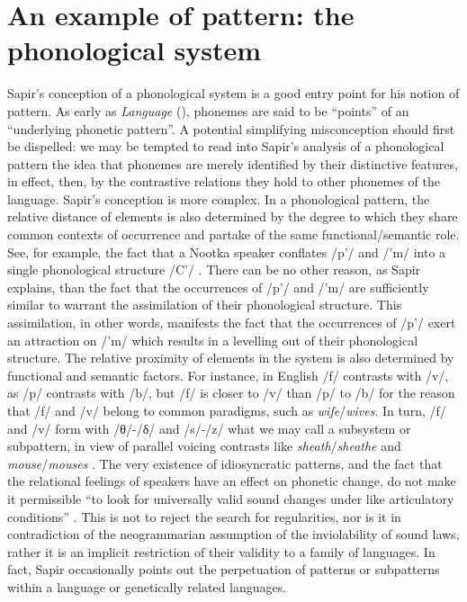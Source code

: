 \documentclass[output=paper]{langscibook}
\begin{document}
\section{An example of pattern: the phonological system}
\label{sec:fortis:egpattern}

Sapir's conception of a phonological system is a good entry point for his notion of pattern. As early as \emph{Language} (\citeyear{Sapir1921}), phonemes are said to be ``points'' of an ``underlying phonetic pattern''. A potential simplifying misconception should first be dispelled: we may be tempted to read into Sapir's analysis of a phonological pattern the idea that phonemes are merely identified by their distinctive features, in effect, then, by the contrastive relations they hold to other phonemes of the language. Sapir's conception is more complex. In a phonological pattern, the relative distance of elements is also determined by the degree to which they share common contexts of occurrence and partake of the same functional/semantic role. See, for example, the fact that a Nootka speaker conflates /p'/ and /'m/ into a single phonological structure /C'/ \citep[55--57]{Sapir1933}. There can be no other reason, as Sapir explains, than the fact that the occurrences of /p'/ and /'m/ are sufficiently similar to warrant the assimilation of their phonological structure. This assimilation, in other words, manifests the fact that the occurrences of /p'/ exert an attraction on /'m/ which results in a levelling out of their phonological structure. The relative proximity of elements in the system is also determined by functional and semantic factors. For instance, in English /f/ contrasts with /v/, as /p/ contrasts with /b/, but /f/ is closer to /v/ than /p/ to /b/ for the reason that /f/ and /v/ belong to common paradigms, such as \emph{wife}/\emph{wives}. In turn, /f/ and /v/ form with /θ/-/δ/ and /s/-/z/ what we may call a subsystem or subpattern, in view of parallel voicing contrasts like \emph{sheath}/\emph{sheathe} and \emph{mouse}/\emph{mouses} \citep[48]{Sapir1933}. The very existence of idiosyncratic patterns, and the fact that the relational feelings of speakers have an effect on phonetic change, do not make it permissible ``to look for universally valid sound changes under like articulatory conditions'' \citep[48]{Sapir1933}. This is not to reject the search for regularities, nor is it in contradiction of the neogrammarian assumption of the inviolability of sound laws, rather it is an implicit restriction of their validity to a family of languages. In fact, Sapir occasionally points out the perpetuation of patterns or subpatterns within a language or genetically related languages.
\end{document}
